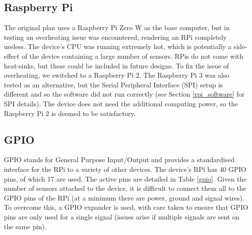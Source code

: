 \documentclass[11pt,twosided,a4paper]{report}
\begin{document}

\subsection{Raspberry Pi}

The original plan uses a Raspberry Pi Zero W as the base computer, but in testing an overheating issue was encountered, rendering an RPi completely useless. The device's CPU was running extremely hot, which is potentially a side-effect of the device containing a large number of sensors. RPis do not come with heat-sinks, but these could be included in future designs. To fix the issue of overheating, we switched to a Raspberry Pi 2. The Raspberry Pi 3 was also tested as an alternative, but the Serial Peripheral Interface (SPI) setup is different and so the software did not run correctly (see Section \ref{rpi_software} for SPI details). The device does not need the additional computing power, so the Raspberry Pi 2 is deemed to be satisfactory.

\subsection{GPIO}

GPIO stands for General Purpose Input/Output and provides a standardised interface for the RPi to a variety of other devices. The device's RPi has 40 GPIO pins, of which 17 are used. The active pins are detailed in Table \ref{gpio}. Given the number of sensors attached to the device, it is difficult to connect them all to the GPIO pins of the RPi (at a minimum there are power, ground and signal wires). To overcome this, a GPIO expander is used, with care taken to ensure that GPIO pins are only used for a single signal (issues arise if multiple signals are sent on the same pin). 
\end{document}
